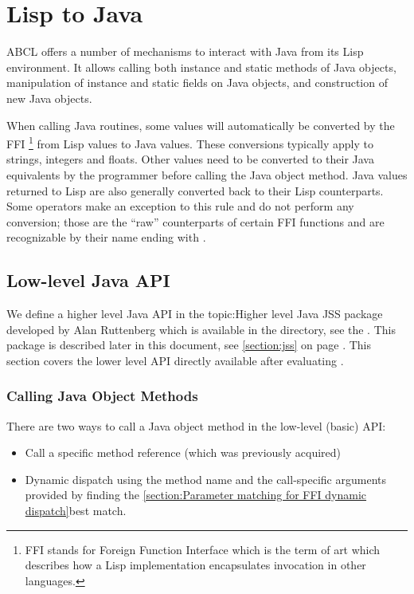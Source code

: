 \documentclass[10pt]{book}
\begin{document}
\section{Lisp to Java}

\textsc{ABCL} offers a number of mechanisms to interact with Java from its
Lisp environment. It allows calling both instance and static methods
of Java objects, manipulation of instance and static fields on Java
objects, and construction of new Java objects.

When calling Java routines, some values will automatically be
converted by the FFI \footnote{FFI stands for Foreign Function
  Interface which is the term of art which describes how a Lisp
  implementation encapsulates invocation in other languages.}  from
Lisp values to Java values. These conversions typically apply to
strings, integers and floats. Other values need to be converted to
their Java equivalents by the programmer before calling the Java
object method. Java values returned to Lisp are also generally
converted back to their Lisp counterparts. Some operators make an
exception to this rule and do not perform any conversion; those are
the ``raw'' counterparts of certain FFI functions and are recognizable
by their name ending with .

\subsection{Low-level Java API}

We define a higher level Java API in the topic:Higher level Java JSS
package developed by Alan Ruttenberg which is available in the
 directory, see the  . This package is
described later in this document, see \ref{section:jss} on page
\pageref{section:jss}.  This section covers the lower level API
directly available after evaluating .

\subsubsection{Calling Java Object Methods}

There are two ways to call a Java object method in the low-level (basic) API:

\begin{itemize}
\item Call a specific method reference (which was previously acquired)
\item Dynamic dispatch using the method name and
  the call-specific arguments provided by finding the
  \ref{section:Parameter matching for FFI dynamic dispatch}{best match}.
\end{itemize}
\end{document}
